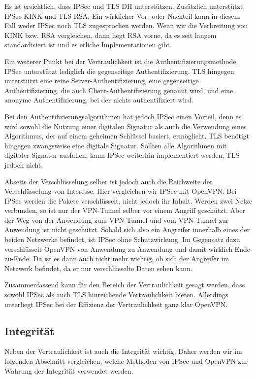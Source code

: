 \documentclass[12pt]{scrartcl}
\begin{document}

Es ist ersichtlich, dass IPSec und TLS DH unterstützen. Zusätzlich unterstützt IPSec KINK und TLS RSA. Ein wirklicher Vor- oder Nachteil kann in diesem Fall weder IPSec noch TLS zugesprochen werden. Wenn wir die Verbreitung von KINK bzw. RSA vergleichen, dann liegt RSA vorne, da es seit langem standardisiert ist und es etliche Implementationen gibt.

Ein weiterer Punkt bei der Vertraulichkeit ist die Authentifizierungsmethode. IPSec unterstützt lediglich die gegenseitige Authentifizierung. TLS hingegen unterstützt eine reine Server-Authentifizierung, eine gegenseitige Authentifizierung, die auch Client-Authentifizierung genannt wird, und eine anonyme Authentifizierung, bei der nichts authentifiziert wird.\cite{Alshamsi2005}

Bei den Authentifizierungsalgorithmen hat jedoch IPSec einen Vorteil, denn es wird sowohl die Nutzung einer digitalen Signatur als auch die Verwendung eines Algorithmus, der auf einem geheimen Schlüssel basiert, ermöglicht. TLS benötigt hingegen zwangsweise eine digitale Signatur. Sollten alle Algorithmen mit digitaler Signatur ausfallen, kann IPSec weiterhin implementiert werden, TLS jedoch nicht.\cite{Alshamsi2005}

Abseits der Verschlüsselung selber ist jedoch auch die Reichweite der Verschlüsselung von Interesse. Hier vergleichen wir IPSec mit OpenVPN. Bei IPSec werden die Pakete verschlüsselt, nicht jedoch ihr Inhalt. Werden zwei Netze verbunden, so ist nur der VPN-Tunnel selber vor einem Angriff geschützt. Aber der Weg von der Anwendung zum VPN-Tunnel und vom VPN-Tunnel zur Anwendung ist nicht geschützt. Sobald sich also ein Angreifer innerhalb eines der beiden Netzwerke befindet, ist IPSec ohne Schutzwirkung.
Im Gegensatz dazu verschlüsselt OpenVPN von Anwendung zu Anwendung und damit wirklich Ende-zu-Ende. Da ist es dann auch nicht mehr wichtig, ob sich der Angreifer im Netzwerk befindet, da er nur verschlüsselte Daten sehen kann.\cite{Sun2011}

Zusammenfassend kann für den Bereich der Vertraulichkeit gesagt werden, dass sowohl IPSec als auch TLS hinreichende Vertraulichkeit bieten. Allerdings unterliegt IPSec bei der Effizienz der Vertraulichkeit ganz klar OpenVPN.

\subsection{Integrität}
Neben der Vertraulichkeit ist auch die Integrität wichtig. Daher werden wir im folgenden Abschnitt vergleichen, welche Methoden von IPSec und OpenVPN zur Wahrung der Integrität verwendet werden.
\end{document}
